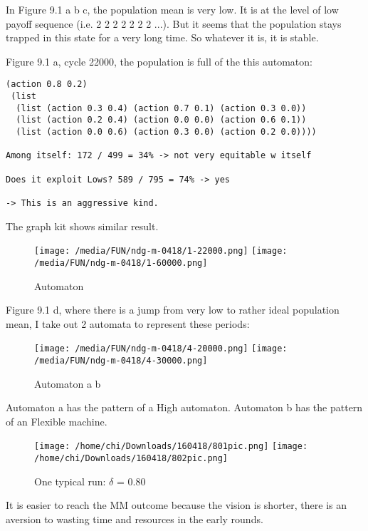 \documentclass[12.5pt]{report}
\begin{document}
In Figure 9.1 a b c, the population mean is very low. It is at the level of low payoff sequence (i.e. 2 2 2 2 2 2 2 ...). But it seems that the population stays trapped in this state for a very long time. So whatever it is, it is stable.

Figure 9.1 a, cycle 22000, the population is full of the this automaton:

\begin{verbatim}
(action 0.8 0.2)
 (list
  (list (action 0.3 0.4) (action 0.7 0.1) (action 0.3 0.0))
  (list (action 0.2 0.4) (action 0.0 0.0) (action 0.6 0.1))
  (list (action 0.0 0.6) (action 0.3 0.0) (action 0.2 0.0))))
  
Among itself: 172 / 499 = 34% -> not very equitable w itself

Does it exploit Lows? 589 / 795 = 74% -> yes

-> This is an aggressive kind.
\end{verbatim}

The graph kit shows similar result.

\begin{figure}
\center
\texttt{[image: /media/FUN/ndg-m-0418/1-22000.png]}
\texttt{[image: /media/FUN/ndg-m-0418/1-60000.png]}
\caption{Automaton}
\end{figure}

Figure 9.1 d, where there is a jump from very low to rather ideal population mean, I take out 2 automata to represent these periods:

\begin{figure}
\center
\texttt{[image: /media/FUN/ndg-m-0418/4-20000.png]}
\texttt{[image: /media/FUN/ndg-m-0418/4-30000.png]}
\caption{Automaton a b}
\end{figure}

Automaton a has the pattern of a High automaton. Automaton b has the pattern of an Flexible machine.



\begin{figure}
\texttt{[image: /home/chi/Downloads/160418/801pic.png]}
\texttt{[image: /home/chi/Downloads/160418/802pic.png]}

\caption{One typical run: $\delta$ = 0.80}
\end{figure}

It is easier to reach the MM outcome because the vision is shorter, there is an aversion to wasting time and resources in the early rounds.
\end{document}
